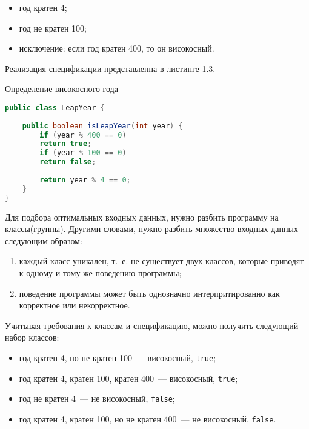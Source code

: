 \begin{itemize}
	\item год кратен 4;
	\item год не кратен 100;
	\item исключение: если год кратен 400, то он високосный.
\end{itemize}

Реализация спецификации представленна в листинге 1.3.

\begin{ListingEnv}[!h]%
	\captiondelim{ } %
	\caption{Определение високосного года}
	\begin{lstlisting}[language={Java}]
public class LeapYear {
	
	public boolean isLeapYear(int year) {
		if (year % 400 == 0)
		return true;
		if (year % 100 == 0)
		return false;
		
		return year % 4 == 0;
	}
}
	\end{lstlisting}
\end{ListingEnv}%

 Для подбора оптимальных входных данных, нужно разбить программу на классы(группы). Другими словами, нужно разбить множество входных данных следующим образом:
 
 \begin{enumerate}
 	\item каждый класс уникален, т.~е. не существует двух классов, которые приводят к одному и тому же поведению программы;
 	\item поведение программы может быть однозначно интерпритированно как корректное или некорректное.
 \end{enumerate}

Учитывая требования к классам и спецификацию, можно получить следующий набор классов:

 \begin{itemize}
 	\item год кратен 4, но не кратен 100~--- високосный, \texttt{true};
 	\item год кратен 4, кратен 100, кратен 400~--- високосный, \texttt{true};
 	\item год не кратен 4~--- не високосный, \texttt{false};
 	\item год кратен 4, кратен 100, но не кратен 400~--- не високосный, \texttt{false}.
 \end{itemize}

